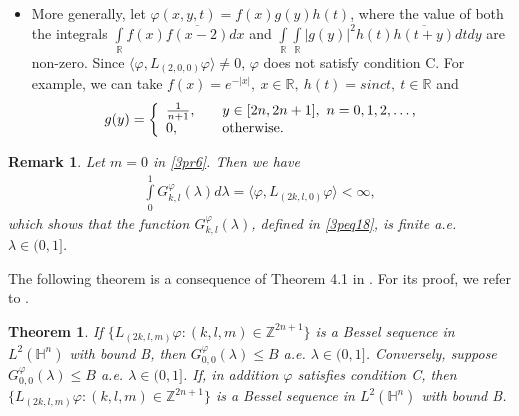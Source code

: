 \documentclass[a4paper,12pt,reqno]{amsart}
\theoremstyle{plain}
\newtheorem{thm}{Theorem}[section]
\numberwithin{equation}{section}
\newtheorem{rem}{Remark}[section]
\theoremstyle{definition}
\begin{document}
\begin{itemize}
\item [6.] More generally, let $\varphi(x,y,t)=f(x)g(y)h(t)$, where the value of both the integrals $\int\limits_{\mathbb{R}} f(x)\overline{f(x-2)}dx$ and $\int\limits_{\mathbb{R}}\int\limits_{\mathbb{R}}|g(y)|^{2}h(t)\overline{h(t+y)}dt dy$ are non-zero. Since
$\langle\varphi, L_{(2,0,0)}\varphi\rangle\neq 0$, $\varphi$ does not satisfy condition C. For example, we can take $f(x)=e^{-|x|},~x\in\mathbb{R},~ h(t)=sinct,~t\in\mathbb{R}$ and 
\begin{eqnarray*}
g(y)&=\left\{
\begin{array}{l l}
\frac{1}{n+1},& \quad \text{$y\in [2n,2n+1],~n=0,1,2,\dotsc $,}\\
0, & \quad \text{otherwise.}
\end{array}\right.
\end{eqnarray*}
 \end{itemize}
\begin{rem}
Let $m=0$ in \eqref{3pr6}. Then we have
\begin{eqnarray*}
\int\limits_{0}^{1}G_{k,l}^{\varphi}(\lambda)d\lambda=\langle\varphi, L_{(2k,l,0)}\varphi\rangle<\infty,
\end{eqnarray*}
which shows that the function $G_{k,l}^{\varphi}(\lambda)$, defined in \eqref{3peq18}, is finite a.e. $\lambda\in (0,1]$.
\end{rem}

The following theorem is a consequence of Theorem 4.1 in \cite{ra}. For its proof, we refer to \cite{ra}.
\begin{thm}\label{3pth11}
If $\{L_{(2k,l,m)}\varphi:(k,l,m)\in\mathbb{Z}^{2n+1}\}$ is a Bessel sequence in $L^{2}(\mathbb{H}^{n})$ with bound B, then $G_{0,0}^{\varphi}(\lambda)\leq B$ a.e. $\lambda\in(0,1]$. Conversely, suppose $G_{0,0}^{\varphi}(\lambda)\leq B$ a.e. $\lambda\in(0,1]$. If, in addition $\varphi$ satisfies condition C, then $\{L_{(2k,l,m)}\varphi:(k,l,m)\in\mathbb{Z}^{2n+1}\}$ is a Bessel sequence in $L^{2}(\mathbb{H}^{n})$ with bound B.
\end{thm}
\end{document}
